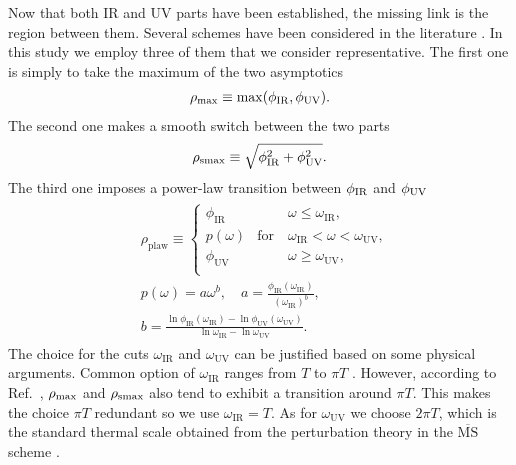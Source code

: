 \documentclass[floatfix,twocolumn,prd,showpacs,preprintnumbers,amsmath,nofootinbib,amssymb,superscriptaddress]{revtex4-2}
\def\ccite#1{Ref.~\cite{#1}} %
\begin{document}
Now that both IR and UV parts have been established, the missing link is the region between them.
Several schemes have been considered in the literature \cite{Francis:2015daa, Altenkort:2020fgs, Brambilla:2020siz, Banerjee:2022uge, Brambilla:2022xbd, Banerjee:2022gen, Altenkort:2023oms}.
In this study we employ three of them that we consider representative. The first one is simply to take the maximum of the two asymptotics \cite{Francis:2015daa}
\begin{align}
    \rho_{\rm{max}} \equiv \rm{max}(\phi_{\rm{IR}}, \phi_{\rm{UV}}).
    \label{model1}   
\end{align}
The second one makes a smooth switch between the two parts \cite{Francis:2015daa}
\begin{align}
    \rho_{\rm{smax}} \equiv \sqrt{\phi_{\rm{IR}}^2+ \phi_{\rm{UV}}^2}.
    \label{model2}  
\end{align}
The third one imposes a power-law transition between $\phi_{\rm{IR}}$ and $\phi_{\rm{UV}}$ \cite{Brambilla:2020siz}
\begin{align}
    \begin{split}
    &\rho_\mathrm{plaw}\equiv
    \begin{cases}
    \phi_\mathrm{IR} & \phantom{\mathrm{for}}\quad \omega \leq \omega_\mathrm{IR},    \\
    p(\omega)        & \mathrm{for}\quad \omega_\mathrm{IR} < \omega < \omega_\mathrm{UV},\\
    \phi_\mathrm{UV} & \phantom{\mathrm{for}}\quad \omega \geq \omega_\mathrm{UV}, \\
    \end{cases} \\
    & p(\omega) = a \omega^b,\quad a = \frac{\phi_\mathrm{IR}(\omega_\mathrm{IR})}{(\omega_\mathrm{IR})^b}, \\
    & b =  \frac{\ln\phi_\mathrm{IR}(\omega_\mathrm{IR})-\ln\phi_\mathrm{UV}(\omega_\mathrm{UV})}{\ln\omega_\mathrm{IR}- \ln\omega_\mathrm{UV}}.
    \end{split}
    \label{model3}
\end{align}
The choice for the cuts $\omega_\mathrm{IR}$ and $\omega_\mathrm{UV}$ can be justified based on some physical arguments. Common option of $\omega_\mathrm{IR}$ ranges from $T$ \cite{Kajantie:1997tt} to $\pi T$ \cite{Gubser:2006nz}. However, according to \ccite{Altenkort:2020fgs}, $\rho_{\rm{max}}$ and $\rho_{\rm{smax}}$ also tend to exhibit a transition around $\pi T$. This makes the choice $\pi T$ redundant so we use $\omega_\mathrm{IR}=T$.
As for $\omega_\mathrm{UV}$ we choose $2\pi T$, which is the standard thermal scale obtained from the perturbation theory in the $\overline{\mathrm{MS}}$ scheme \cite{Kajantie:1997tt}.
\end{document}

